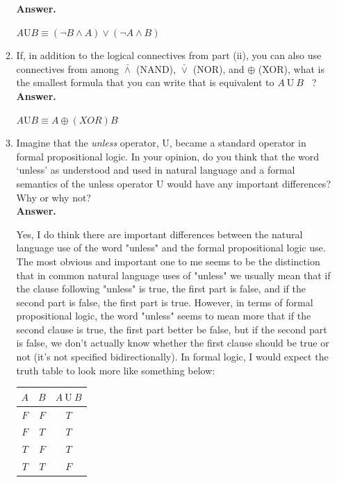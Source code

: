 \documentclass[12pt]{article}
\newenvironment{problem}[2][Problem]{\begin{trivlist}
\item[\hskip \labelsep {\bfseries #1}\hskip \labelsep {\bfseries #2.}]}{\end{trivlist}}
\begin{document}
\begin{problem}{1}
\begin{enumerate}[label=\Alph*.]
\begin{enumerate}[label=\roman*.]
\textbf{Answer.}  

$A \mathrm{U} B \equiv (\neg B \land A) \lor (\neg A \land B)$

\newpage 

\item If, in addition to the logical connectives from part (ii), you can also use connectives from among $\bar\land$ (NAND), $\bar\lor$ (NOR), and $\oplus$ (XOR), what is the smallest formula that you can write that is equivalent to $A \ \mathrm{U} \ B$ \ ? \\

\textbf{Answer.} 

$A \mathrm{U} B \equiv A \oplus (XOR) B$


\item Imagine that the \textit{unless} operator, $\mathrm{U}$, became a standard operator in formal propositional logic. In your opinion, do you think that the word `unless' as understood and used in natural language and a formal semantics of the unless operator $\mathrm{U}$ would have any important differences? Why or why not? \\

\textbf{Answer.} 

Yes, I do think there are important differences between the natural language use of the word "unless" and the formal propositional logic use. The most obvious and important one to me seems to be the distinction that in common natural language uses of "unless" we usually mean that if the clause following "unless" is true, the first part is false, and if the second part is false, the first part is true. However, in terms of formal propositional logic, the word "unless" seems to mean more that if the second clause is true, the first part better be false, but if the second part is false, we don't actually know whether the first clause should be true or not (it's not specified bidirectionally). In formal logic, I would expect the truth table to look more like something below:

\begin{center}
\begin{tabular}{|c|c||c|}
\hline
$A$ & $B$ & $A \ \mathrm{U} \ B$ \\ \hline \hline
$F$ & $F$ & $T$ \\ \hline
$F$ & $T$ & $T$ \\ \hline
$T$ & $F$ & $T$ \\ \hline
$T$ & $T$ & $F$ \\ \hline
\end{tabular} \\ 
\end{center} 


\end{enumerate}
\end{enumerate}
\end{problem}
\end{document}
